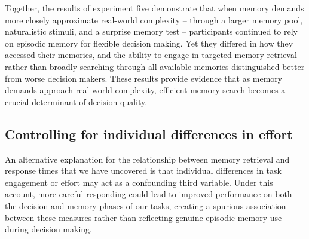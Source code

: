 \documentclass[10pt,letterpaper]{article}
\begin{document}

Together, the results of experiment five demonstrate that when memory demands more closely approximate real-world complexity -- through a larger memory pool, naturalistic stimuli, and a surprise memory test -- participants continued to rely on episodic memory for flexible decision making. Yet they differed in how they accessed their memories, and the ability to engage in targeted memory retrieval rather than broadly searching through all available memories distinguished better from worse decision makers. These results provide evidence that as memory demands approach real-world complexity, efficient memory search becomes a crucial determinant of decision quality.

\subsection{Controlling for individual differences in effort}

An alternative explanation for the relationship between memory retrieval and response times that we have uncovered is that individual differences in task engagement or effort may act as a confounding third variable. Under this account, more careful responding could lead to improved performance on both the decision and memory phases of our tasks, creating a spurious association between these measures rather than reflecting genuine episodic memory use during decision making.
\end{document}
